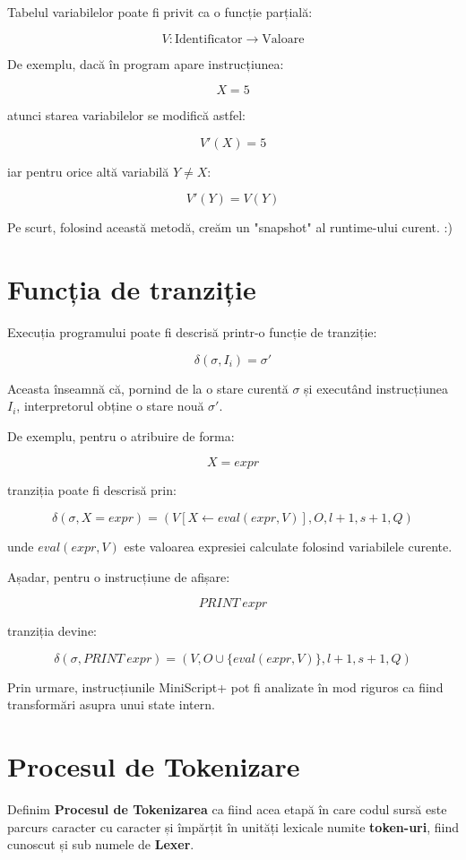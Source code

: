 \documentclass[12pt]{article}
\begin{document}
Tabelul variabilelor poate fi privit ca o funcție parțială:

\[
V : \text{Identificator} \rightarrow \text{Valoare}
\]

De exemplu, dacă în program apare instrucțiunea:

\[
X = 5
\]

atunci starea variabilelor se modifică astfel:

\[
V'(X) = 5
\]

iar pentru orice altă variabilă \(Y \neq X\):

\[
V'(Y) = V(Y)
\]

Pe scurt, folosind această metodă, creăm un "snapshot" al runtime-ului curent. :)

\section{Funcția de tranziție}

Execuția programului poate fi descrisă printr-o funcție de tranziție:

\[
\delta(\sigma, I_i) = \sigma'
\]

Aceasta înseamnă că, pornind de la o stare curentă \(\sigma\) și executând instrucțiunea \(I_i\), interpretorul obține o stare nouă \(\sigma'\).

De exemplu, pentru o atribuire de forma:

\[
X = expr
\]

tranziția poate fi descrisă prin:

\[
\delta(\sigma, X = expr) =
(V[X \leftarrow eval(expr, V)], O, l+1, s+1, Q)
\]

unde \(eval(expr, V)\) este valoarea expresiei calculate folosind variabilele curente.

Așadar, pentru o instrucțiune de afișare:

\[
PRINT \ expr
\]

tranziția devine:

\[
\delta(\sigma, PRINT \ expr) =
(V, O \cup \{eval(expr, V)\}, l+1, s+1, Q)
\]

Prin urmare, instrucțiunile MiniScript+ pot fi analizate în mod riguros ca fiind transformări asupra unui state intern.

\section{Procesul de Tokenizare}

Definim \textbf{Procesul de Tokenizarea} ca fiind acea etapă în care codul sursă este parcurs caracter cu caracter și împărțit în unități lexicale numite \textbf{token-uri}, fiind cunoscut și sub numele de \textbf{Lexer}.
\end{document}
